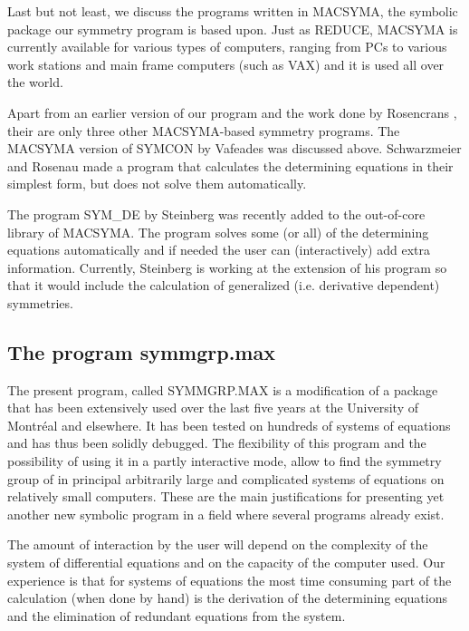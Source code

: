 \nopagebreak
Last but not least, we discuss the programs written in MACSYMA, the
symbolic package our symmetry program is based upon.
Just as REDUCE, MACSYMA is currently available for various types of computers, 
ranging from PCs to various work stations and main frame computers 
(such as VAX) and it is used all over the world.

\nopagebreak
Apart from an earlier version of our program \cite{champagneprogram} and the 
work done by Rosencrans \cite{rosencransprogram},
their are only three other MACSYMA-based symmetry programs.
\pagebreak
\noindent
The MACSYMA version of SYMCON by Vafeades \cite{vafeadesprogram2} 
was discussed above. Schwarzmeier and Rosenau 
\cite{rosenauschwarzmeierprogram,schwarzmeierrosenauprogram} made a
program that calculates the determining equations in their simplest form, 
but does not solve them automatically. 

\nopagebreak
The program SYM\_DE by Steinberg \cite{steinbergprogram1,steinbergprogram2} 
was recently added to the out-of-core library of MACSYMA. The program solves
some (or all) of the determining equations automatically and if needed the
user can (interactively) add extra information. Currently, Steinberg is working
at the extension of his program so that it would include the calculation 
of generalized (i.e. derivative dependent) symmetries.

\subsection{The program symmgrp.max}

\nopagebreak
The present program, called SYMMGRP.MAX is a modification of a 
package \cite{champagneprogram} that has been extensively used over the
last five years at the University of Montr\'{e}al and elsewhere. 
It has been tested on hundreds of systems of equations and has thus been 
solidly debugged.
The flexibility of this program and the possibility of using it in a
partly interactive mode, allow to find the symmetry group of in principal
arbitrarily large and complicated systems of equations 
on relatively small computers.
These are the main justifications for presenting yet another 
new symbolic program in a field where several programs already exist.

\nopagebreak
The amount of interaction by the user will depend on the
complexity of the system of differential equations and on the capacity
of the computer used.
Our experience is that for systems of equations the most time consuming
part of the calculation (when done by hand) is the derivation of the
determining equations and the elimination of redundant equations from the
system. 

